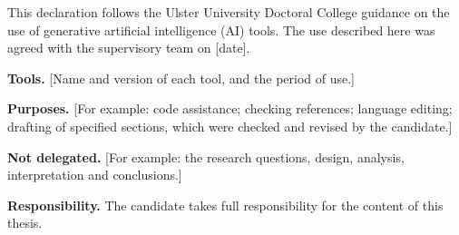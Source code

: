 This declaration follows the Ulster University Doctoral College guidance on the use of generative artificial
intelligence (AI) tools. The use described here was agreed with the supervisory team on [date].

\textbf{Tools.} [Name and version of each tool, and the period of use.]

\textbf{Purposes.} [For example: code assistance; checking references; language editing; drafting of specified
sections, which were checked and revised by the candidate.]

\textbf{Not delegated.} [For example: the research questions, design, analysis, interpretation and conclusions.]

\textbf{Responsibility.} The candidate takes full responsibility for the content of this thesis.
